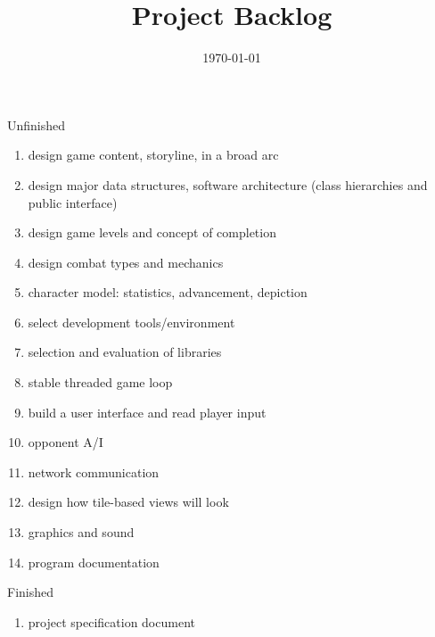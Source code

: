 \documentclass[12pt]{article}
\title{Project Backlog}
\date{\today}
\begin{document}
\maketitle

\begin{section}{Unfinished}
\begin{enumerate}
\item design game content, storyline, in a broad arc
\item design major data structures, software architecture (class
	hierarchies and public interface)
\item design game levels and concept of completion
\item design combat types and mechanics
\item character model: statistics, advancement, depiction
\item select development tools/environment
\item selection and evaluation of libraries
\item stable threaded game loop
\item build a user interface and read player input
\item opponent A/I
\item network communication
\item design how tile-based views will look
\item graphics and sound
\item program documentation
\end{enumerate}
\end{section}

\begin{section}{Finished}
\begin{enumerate}
\item project specification document
\end{enumerate}
\end{section}
\end{document}

